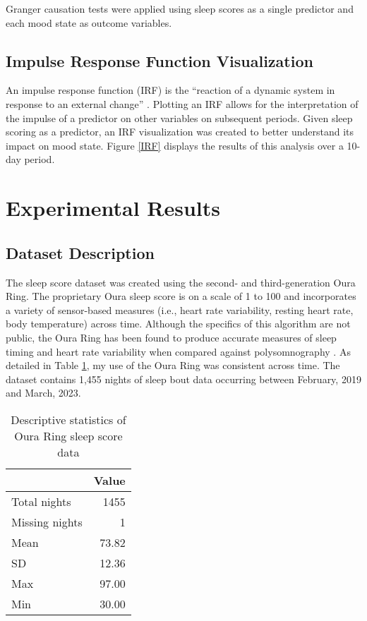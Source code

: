 \documentclass[9pt]{article}
\begin{document}
Granger causation tests were applied using sleep scores as a single predictor
and each mood state as outcome variables.

\subsection{Impulse Response Function
Visualization}\label{impulse-response-analysis}

An impulse response function (IRF) is the ``reaction of a dynamic system in
response to an external change'' \citep{devriesWearableMeasured2023}. Plotting
an IRF allows for the interpretation of the impulse of a predictor on other
variables on subsequent periods. Given sleep scoring as a predictor, an IRF
visualization was created to better understand its impact on mood state. Figure
\ref{IRF} displays the results of this analysis over a 10-day period.

\section{Experimental Results}\label{results}

\subsection{Dataset Description}\label{dataset-description}

The sleep score dataset was created using the second- and third-generation Oura
Ring. The proprietary Oura sleep score is on a scale of 1 to 100 and
incorporates a variety of sensor-based measures (i.e., heart rate variability,
resting heart rate, body temperature) across time. Although the specifics of
this algorithm are not public, the Oura Ring has been found to produce accurate
measures of sleep timing and heart rate variability when compared against
polysomnography \citep{dezambottiSleep2019}. As detailed in Table \ref{Sleep},
my use of the Oura Ring was consistent across time. The dataset contains 1,455
nights of sleep bout data occurring between February, 2019 and March, 2023.

\begin{table}[hb] \centering \begin{tabular}{lr} \toprule & \textbf{Value}\\
\midrule Total nights & 1455 \\ Missing nights & 1 \\ Mean & 73.82 \\ SD &
12.36 \\ Max & 97.00 \\ Min & 30.00 \\ \bottomrule \end{tabular}
\caption{Descriptive statistics of Oura Ring sleep score data} \label{Sleep}
\end{table}
\end{document}
